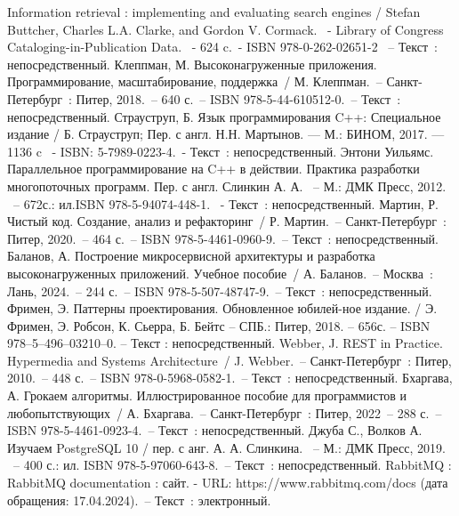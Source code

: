 
\begin{thebibliography}{11}
	 Information retrieval : implementing and evaluating search engines / Stefan Buttcher, Charles L.A. Clarke, and Gordon V. Cormack. ~- Library of Congress Cataloging-in-Publication Data. ~- 624 c.~- ISBN 978-0-262-02651-2 ~– Текст~: непосредственный.
	 Клеппман, М. Высоконагруженные приложения. Программирование, масштабирование, поддержка~/ М. Клеппман.~– Санкт-Петербург~: Питер, 2018.~– 640 с.~– ISBN 978-5-44-610512-0.~– Текст~: непосредственный.
	 Страуструп, Б. Язык программирования C++: Специальное издание / Б. Страуструп; Пер. с англ. Н.Н. Мартынов. — М.: БИНОМ, 2017. — 1136 c ~- ISBN: 5-7989-0223-4.~- Текст~: непосредственный.
	 Энтони Уильямс. Параллельное программирование на C++ в действии. Практика разработки многопоточных программ. Пер. с англ. Слинкин А. А. ~– М.: ДМК Пресс, 2012. ~– 672с.: ил.ISBN 978-5-94074-448-1. ~- Текст~: непосредственный.
		Мартин, Р. Чистый код. Создание, анализ и рефакторинг~/ Р. Мартин.~– Санкт-Петербург~: Питер, 2020.~– 464 с.~– ISBN 978-5-4461-0960-9.~– Текст~: непосредственный.
     Баланов, А. Построение микросервисной архитектуры и разработка высоконагруженных приложений. Учебное пособие~/ А. Баланов.~– Москва~: Лань, 2024.~– 244 с.~– ISBN 978-5-507-48747-9.~– Текст~: непосредственный.
	 Фримен, Э. Паттерны проектирования. Обновленное юбилей-ное издание. / Э. Фримен, Э. Робсон, К. Сьерра, Б. Бейтс – СПБ.: Питер, 2018. – 656с. – ISBN 978–5–496–03210–0. – Текст : непосредственный.
		Webber, J. REST in Practice. Hypermedia and Systems Architecture~/ J. Webber.~– Санкт-Петербург~: Питер, 2010.~– 448 с.~– ISBN 978-0-5968-0582-1.~– Текст~: непосредственный.
	 Бхаргава, А. Грокаем алгоритмы. Иллюстрированное пособие для программистов и любопытствующих~/ А. Бхаргава.~– Санкт-Петербург~: Питер, 2022~– 288 с.~– ISBN 978-5-4461-0923-4.~– Текст~: непосредственный.
	 Джуба С., Волков А. Изучаем PostgreSQL 10 / пер. с анг. А. А. Слинкина. ~– М.: ДМК Пресс, 2019. ~– 400 с.: ил. ISBN 978-5-97060-643-8.~– Текст~: непосредственный.
	 RabbitMQ : RabbitMQ  documentation : сайт. - URL: https://www.rabbitmq.com/docs (дата обращения: 17.04.2024).~– Текст~: электронный.
\end{thebibliography}
